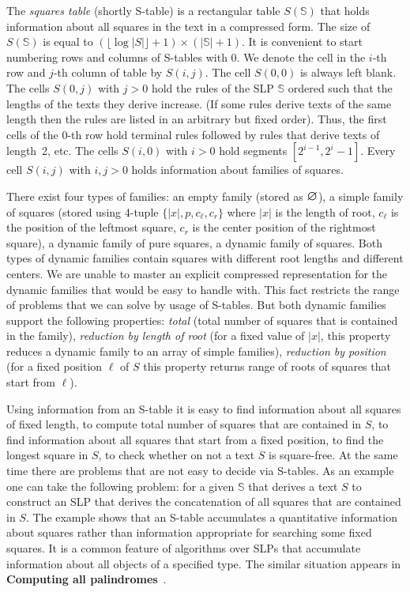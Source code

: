 \documentclass[10pt]{article}
\newcommand{\slp}[1]{\mathbb{#1}}
\renewcommand{\emptyset}{
    \font\msbm = msbm10 at 12pt 
    \mbox{\msbm \char 63}
}
\begin{document}
The \emph{squares table} (shortly S-table) is a rectangular table $S(\slp{S})$ that holds information about all 
squares in the text in a compressed form. The size of $S(\slp{S})$ is equal to $(\lfloor\log |S|\rfloor+1) \times
(|\slp{S}|+1)$. It is convenient to start numbering rows and columns of S-tables with 0. We denote the cell in the
$i$-th row and $j$-th column of table by $S(i,j)$. The cell $S(0,0)$ is always left blank. The cells $S(0,j)$ with
$j>0$ hold the rules of the SLP $\slp{S}$ ordered such that the lengths of the texts they derive increase. (If some
rules derive texts of the same length then the rules are listed in an arbitrary but fixed order). Thus, the first cells
of the 0-th row hold terminal rules followed by rules that derive texts of length~2, etc. The cells $S(i,0)$ with
$i>0$ hold segments $[2^{i-1}, 2^i - 1]$. Every cell $S(i, j)$ with $i,j>0$ holds information about families of squares.

There exist four types of families: an empty family (stored as $\emptyset$), a simple family of squares (stored using 
4-tuple $\{|x|, p, c_\ell, c_r \}$ where $|x|$ is the length of root, $c_\ell$ is the position of the leftmost square, 
$c_r$ is the center position of the rightmost square), a dynamic family of pure squares, a dynamic family of squares. 
Both types of dynamic families contain squares with different root lengths and different centers. We are unable to master 
an explicit compressed representation for the dynamic families that would be easy to handle with. This fact restricts the range of problems 
that we can solve by usage of S-tables. But both dynamic families support the following properties: 
\emph{total} (total number of squares that is contained in the family), \emph{reduction by length of root} 
(for a fixed value of $|x|$, this property reduces a dynamic family to an array of simple families), 
\emph{reduction by position} (for a fixed position $\ell$ of $S$ this property returns range of roots of squares that start from $\ell$).

Using information from an S-table it is easy to find information about all squares of fixed length, to compute total number of squares 
that are contained in $S$, to find information about all squares that start from a fixed position, to find the longest square in $S$,
to check whether on not a text $S$ is square-free. At the same time there are problems that are not easy to decide via S-tables.
As an example one can take the following problem: for a given $\slp{S}$ that derives a text $S$ to construct an SLP that derives 
the concatenation of all squares that are contained in $S$. 
The example shows that an S-table accumulates a quantitative information about squares rather than information
appropriate for searching some fixed squares. It is a common feature of algorithms over SLPs that accumulate information 
about all objects of a specified type. The similar situation appears in \textbf{Computing all palindromes}~\cite{16}.
\end{document}
